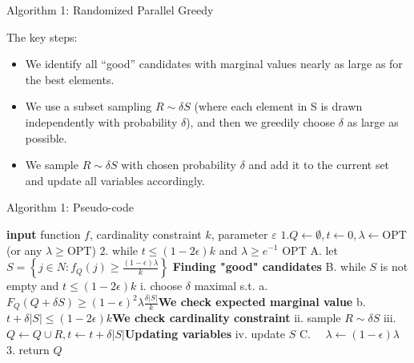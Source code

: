 \documentclass{beamer} %
\begin{document}
\begin{frame}{Algorithm 1: Randomized Parallel Greedy}
\begin{block}{The key steps:}
    \vspace{15pt}
\begin{itemize}
    \item We identify all “good” candidates with marginal values nearly as large as for the best elements.
    \vspace{15pt}
    \item We use a subset sampling $R \sim \delta S$ (where each element in S is drawn independently with probability $\delta$), and then we greedily choose $\delta$ as large as possible.
    \vspace{15pt}
    \item We sample  $R \sim \delta S$ with chosen probability $\delta$ and add it to the current set and update all variables accordingly.  
\end{itemize}
\end{block}

    
\end{frame}

\begin{frame}{Algorithm 1: Pseudo-code}

\begin{algorithm}[H]
\caption{Randomized Parallel Greedy}
  \label{greedy}
\begin{algorithmic}
\footnotesize
    	\STATE \textbf{input} function $f$, cardinality constraint $k$, parameter $\varepsilon$
\STATE$1 . Q \leftarrow \emptyset, t \leftarrow 0, \lambda \leftarrow \mathrm{OPT} $ (or any $\lambda \geq \mathrm{OPT}$)
\STATE $2.$ while $t \leq(1-2 \epsilon) k$ and $\lambda \geq e^{-1}$ OPT
\STATE \quad A. let $S=\left\{j \in N: f_{Q}(j) \geq \frac{(1-\epsilon) \lambda}{k}\right\}$ \quad \textbf{Finding "good" candidates}
\STATE \quad B. while $S$ is not empty and $t \leq(1-2 \epsilon) k$
\STATE \quad \quad i. choose $\delta$ maximal s.t.
\STATE \quad \quad \quad a. $F_{Q}(Q+\delta S) \geq(1-\epsilon)^{2} \lambda \frac{\delta|S|}{k}$\quad \textbf{We check expected marginal value}
\STATE \quad \quad \quad b. $t+\delta|S| \leq(1-2 \epsilon) k$\quad\quad\quad \quad  \textbf{We check cardinality constraint}
\STATE \quad \quad ii. sample $R \sim \delta S$
\STATE \quad \quad iii. $Q \leftarrow Q \cup R, t \leftarrow t+\delta|S|$\quad \quad \quad  \textbf{Updating variables}
\STATE \quad \quad iv. update $S$
\STATE \quad C. $\quad \lambda \leftarrow(1-\epsilon) \lambda$
\STATE $3.$ return $Q$
  \end{algorithmic}
\end{algorithm}
\end{frame}
\end{document}
